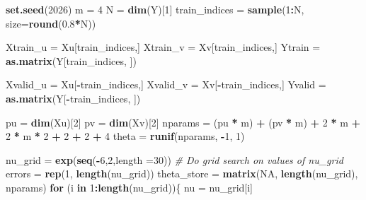 \documentclass[12pt,halfline,a4paper,]{ouparticle}
\newenvironment{Shaded}{\begin{snugshade}}{\end{snugshade}}
\newcommand{\AttributeTok}[1]{\textcolor[rgb]{0.13,0.29,0.53}{#1}}
\newcommand{\CommentTok}[1]{\textcolor[rgb]{0.56,0.35,0.01}{\textit{#1}}}
\newcommand{\ConstantTok}[1]{\textcolor[rgb]{0.56,0.35,0.01}{#1}}
\newcommand{\ControlFlowTok}[1]{\textcolor[rgb]{0.13,0.29,0.53}{\textbf{#1}}}
\newcommand{\DecValTok}[1]{\textcolor[rgb]{0.00,0.00,0.81}{#1}}
\newcommand{\FloatTok}[1]{\textcolor[rgb]{0.00,0.00,0.81}{#1}}
\newcommand{\FunctionTok}[1]{\textcolor[rgb]{0.13,0.29,0.53}{\textbf{#1}}}
\newcommand{\NormalTok}[1]{#1}
\newcommand{\OtherTok}[1]{\textcolor[rgb]{0.56,0.35,0.01}{#1}}
\newcommand{\SpecialCharTok}[1]{\textcolor[rgb]{0.81,0.36,0.00}{\textbf{#1}}}
\begin{document}
\begin{Shaded}
\begin{Highlighting}[]
\FunctionTok{set.seed}\NormalTok{(}\DecValTok{2026}\NormalTok{)}
\NormalTok{m }\OtherTok{=} \DecValTok{4}
\NormalTok{N }\OtherTok{=} \FunctionTok{dim}\NormalTok{(Y)[}\DecValTok{1}\NormalTok{]}
\NormalTok{train\_indices }\OtherTok{=} \FunctionTok{sample}\NormalTok{(}\DecValTok{1}\SpecialCharTok{:}\NormalTok{N, }\AttributeTok{size=}\FunctionTok{round}\NormalTok{(}\FloatTok{0.8}\SpecialCharTok{*}\NormalTok{N))}

\NormalTok{Xtrain\_u }\OtherTok{=}\NormalTok{ Xu[train\_indices,]}
\NormalTok{Xtrain\_v }\OtherTok{=}\NormalTok{ Xv[train\_indices,]}
\NormalTok{Ytrain }\OtherTok{=} \FunctionTok{as.matrix}\NormalTok{(Y[train\_indices, ])}
     
\NormalTok{Xvalid\_u }\OtherTok{=}\NormalTok{ Xu[}\SpecialCharTok{{-}}\NormalTok{train\_indices,]}
\NormalTok{Xvalid\_v }\OtherTok{=}\NormalTok{ Xv[}\SpecialCharTok{{-}}\NormalTok{train\_indices,]}
\NormalTok{Yvalid }\OtherTok{=} \FunctionTok{as.matrix}\NormalTok{(Y[}\SpecialCharTok{{-}}\NormalTok{train\_indices, ])}

\NormalTok{pu }\OtherTok{=} \FunctionTok{dim}\NormalTok{(Xu)[}\DecValTok{2}\NormalTok{]}
\NormalTok{pv }\OtherTok{=} \FunctionTok{dim}\NormalTok{(Xv)[}\DecValTok{2}\NormalTok{]}
\NormalTok{nparams }\OtherTok{=}\NormalTok{ (pu }\SpecialCharTok{*}\NormalTok{ m) }\SpecialCharTok{+}\NormalTok{ (pv }\SpecialCharTok{*}\NormalTok{ m) }\SpecialCharTok{+} \DecValTok{2} \SpecialCharTok{*}\NormalTok{ m  }\SpecialCharTok{+} \DecValTok{2} \SpecialCharTok{*}\NormalTok{ m }\SpecialCharTok{*} \DecValTok{2} \SpecialCharTok{+} \DecValTok{2} \SpecialCharTok{+} \DecValTok{2} \SpecialCharTok{+} \DecValTok{4}
\NormalTok{theta }\OtherTok{=} \FunctionTok{runif}\NormalTok{(nparams, }\SpecialCharTok{{-}}\DecValTok{1}\NormalTok{, }\DecValTok{1}\NormalTok{)}

\NormalTok{nu\_grid }\OtherTok{=} \FunctionTok{exp}\NormalTok{(}\FunctionTok{seq}\NormalTok{(}\SpecialCharTok{{-}}\DecValTok{6}\NormalTok{,}\DecValTok{2}\NormalTok{,length}
            \OtherTok{=}\DecValTok{30}\NormalTok{))}
\CommentTok{\# Do grid search on values of nu\_grid}
\NormalTok{errors }\OtherTok{=} \FunctionTok{rep}\NormalTok{(}\DecValTok{1}\NormalTok{, }\FunctionTok{length}\NormalTok{(nu\_grid))}
\NormalTok{theta\_store }\OtherTok{=} \FunctionTok{matrix}\NormalTok{(}\ConstantTok{NA}\NormalTok{, }\FunctionTok{length}\NormalTok{(nu\_grid), nparams)}
\ControlFlowTok{for}\NormalTok{ (i }\ControlFlowTok{in} \DecValTok{1}\SpecialCharTok{:}\FunctionTok{length}\NormalTok{(nu\_grid))\{}
\NormalTok{  nu }\OtherTok{=}\NormalTok{ nu\_grid[i]}
  

\end{Highlighting}
\end{Shaded}
\end{document}

